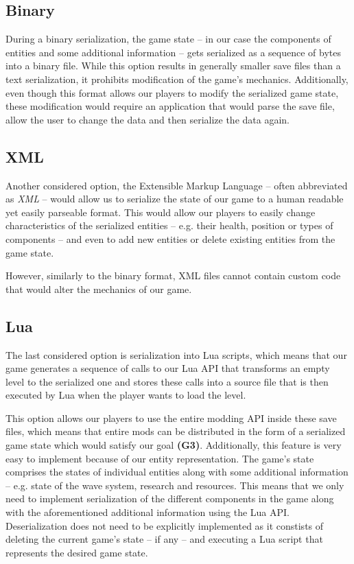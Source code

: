\subsection{Binary}

During a binary serialization, the game state -- in our case the components of entities and some additional information -- gets
serialized as a sequence of bytes into a binary file. While this option results in generally smaller save files than a text serialization,
it prohibits modification of the game's mechanics. Additionally, even though this format allows our players to modify the
serialized game state, these modification would require an application that would parse the save file, allow the user
to change the data and then serialize the data again.

\subsection{XML}

Another considered option, the Extensible Markup Language -- often abbreviated as \emph{XML} -- would allow us to serialize the
state of our game to a human readable yet easily parseable format. This would allow our players to easily change characteristics of the
serialized entities -- e.g. their health, position or types of components -- and even to add new entities or delete existing entities
from the game state.

However, similarly to the binary format, XML files cannot contain custom code that would alter the mechanics of our game.

\subsection{Lua}

The last considered option is serialization into Lua scripts, which means that our game generates a sequence of calls to our Lua
API that transforms an empty level to the serialized one and stores these calls into a source file that is then executed by Lua when
the player wants to load the level.

This option allows our players to use the entire modding API inside these save files, which means that
entire mods can be distributed in the form of a serialized game state which would satisfy our goal \textbf{(G3)}.
Additionally, this feature is very easy to implement because of our
entity representation. The game's state comprises the states of individual entities along with some additional information -- e.g.
state of the wave system, research and resources. This means that we only need to implement serialization of the different
components in the game along with the aforementioned additional information using the Lua API. Deserialization does not need to be explicitly
implemented as it constists of deleting the current game's state -- if any -- and executing a Lua script that represents the desired
game state.

